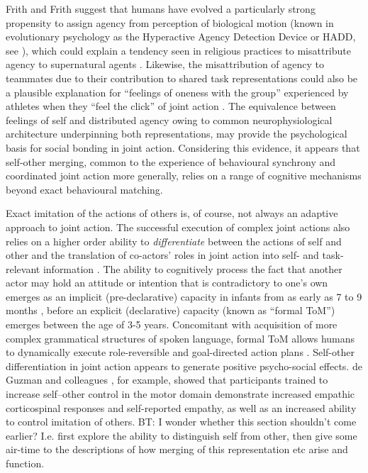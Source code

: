 \begin{CJK}{UTF8}{gbsn}
{Frith and Frith \textcite{Frith2010} suggest that humans have evolved a particularly strong propensity to assign agency from perception of biological motion (known in evolutionary psychology as the Hyperactive Agency Detection Device or HADD, see \cite{Barrett2000,Barrett2007}), which could explain a tendency seen in religious practices to misattribute agency to supernatural agents \citep{Atran2010}.  Likewise, the misattribution of agency to teammates due to their contribution to shared task representations could also be a plausible explanation for ``feelings of oneness with the group'' experienced by athletes when they ``feel the click'' of joint action \citep{Swann2009}. The equivalence between feelings of self and distributed agency owing to common neurophysiological architecture underpinning both representations, may provide the psychological basis for social bonding in joint action.  Considering this evidence, it appears that self-other merging, common to the experience of behavioural synchrony and coordinated joint action more generally, relies on a range of cognitive mechanisms beyond exact behavioural matching.

Exact imitation of the actions of others is, of course, not always an adaptive approach to joint action.  The successful execution of complex joint actions also relies on a higher order ability to \textit{differentiate} between the actions of self and other and the translation of co-actors' roles in joint action into self- and task-relevant information \citep{Novembre2012,Sowden2014,Milward2016}.
The ability to cognitively process the fact that another actor may hold an attitude or intention that is contradictory to one's own emerges as an implicit (pre-declarative) capacity in infants from as early as 7 to 9 months \citep{Baron-Cohen1991}, before an explicit (declarative) capacity (known as ``formal ToM'') emerges between the age of 3-5 years. Concomitant with acquisition of more complex grammatical structures of spoken language, formal ToM allows humans to dynamically execute role-reversible and goal-directed action plans \citep{Tomasello2005a,Tomasello2008,Tomasello2014}.  Self-other differentiation in joint action appears to generate positive psycho-social effects.  de Guzman and colleagues \textcite{DeGuzman2015}, for example, showed that participants trained to increase self–other control in the motor domain demonstrate increased empathic corticospinal responses and self-reported empathy, as well as an increased ability to control imitation of others.
BT: I wonder whether this section shouldn’t come earlier? I.e. first explore the ability to distinguish self from other, then give some air-time to the descriptions of how merging of this representation etc arise and function.

}
\end{CJK}
